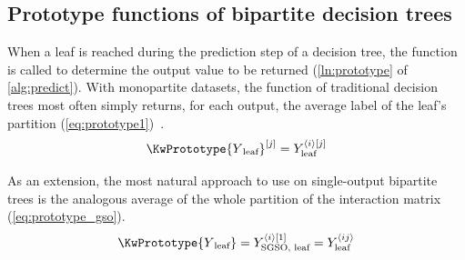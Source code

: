 
%
%
%


\subsection{Prototype functions of bipartite decision trees}
\label{sec:prototype}

When a leaf is reached during the prediction step of a decision tree, the \KwPrototype function is called to determine the output value to be returned (\autoref{ln:prototype} of \autoref{alg:predict}). With monopartite datasets, the \KwPrototype function of traditional decision trees most often simply returns, for each output, the average label of the leaf's partition (\autoref{eq:prototype1})~\cite{breiman1984classification}.
%
\begin{equation}
    \KwPrototype{Y\textsubscript{leaf}}\el j=Y_\text{leaf}^{\ang{i}[j]}
    \label{eq:prototype1}
\end{equation}

As an extension, the most natural approach to use on single-output bipartite trees is the analogous average of the whole partition of the interaction matrix (\autoref{eq:prototype_gso}).
%
\begin{equation}
    \KwPrototype{Y\textsubscript{leaf}}
        = Y_\text{SGSO, leaf}^{\ang{i}[1]}
        = Y_\text{leaf}^{\ang{ij}}
    \label{eq:prototype_gso}
\end{equation}

